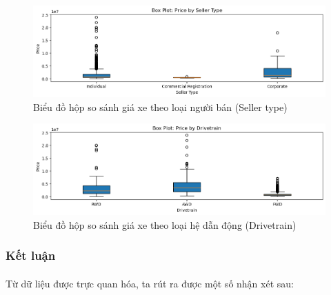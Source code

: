 \begin{figure}[H]
    \centering
    \includegraphics[width=1\linewidth]{img/boxplot-sellertype.png}
    \caption{Biểu đồ hộp so sánh giá xe theo loại người bán (Seller type)}
    \label{fig:boxplot-sellertype}
\end{figure}

\begin{figure}[H]
    \centering
    \includegraphics[width=1\linewidth]{img/boxplot-drivetrain.png}
    \caption{Biểu đồ hộp so sánh giá xe theo loại hệ dẫn động (Drivetrain)}
    \label{fig:boxplot-drivetrain}
\end{figure}

\subsubsection{Kết luận}
\paragraph{}{Từ dữ liệu được trực quan hóa, ta rút ra được một số nhận xét sau:}

